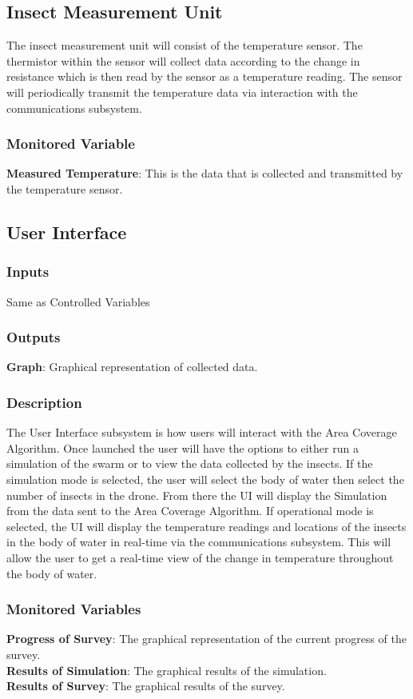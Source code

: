 \documentclass[11pt]{article}
\begin{document}
\subsection{Insect Measurement Unit}
The insect measurement unit will consist of the temperature sensor. The thermistor within the sensor will collect data according to the change in resistance which is then read by the sensor as a temperature reading. The sensor will periodically transmit the temperature data via interaction with the communications subsystem.

\subsubsection{Monitored Variable}
\textbf{Measured Temperature}: This is the data that is collected and transmitted by the temperature sensor. 

\subsection{User Interface}
\subsubsection{Inputs}
Same as Controlled Variables
\subsubsection{Outputs}
\textbf{Graph}: Graphical representation of collected data.
\subsubsection{Description}
The User Interface subsystem is how users will interact with the Area Coverage Algorithm. Once launched the user will have the options to either run a simulation of the swarm or to view the data collected by the insects. If the simulation mode is selected, the user will select the body of water then select the number of insects in the drone. From there the UI will display the Simulation from the data sent to the Area Coverage Algorithm. If operational mode is selected, the UI will display the temperature readings and locations of the insects in the body of water in real-time via the communications subsystem. This will allow the user to get a real-time view of the change in temperature throughout the body of water.
\subsubsection{Monitored Variables}
\textbf{Progress of Survey}: The graphical representation of the current progress of the survey.\\
\textbf{Results of Simulation}: The graphical results of the simulation.\\
\textbf{Results of Survey}: The graphical results of the survey.
\end{document}
